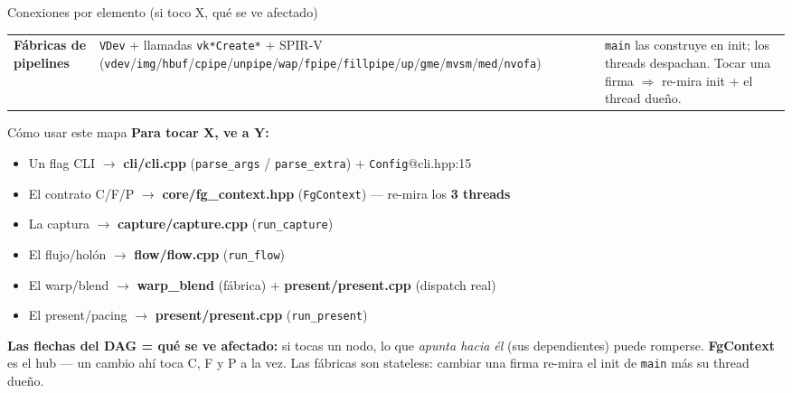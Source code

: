 \documentclass[aspectratio=169]{beamer}
\newcommand{\arr}{\ensuremath{\rightarrow}}
\newcommand{\Lcli}[1]{\textcolor{cliCol}{\textbf{#1}}}
\newcommand{\Lcore}[1]{\textcolor{coreCol}{\textbf{#1}}}
\newcommand{\Lcap}[1]{\textcolor{capCol}{\textbf{#1}}}
\newcommand{\Lflow}[1]{\textcolor{flowCol}{\textbf{#1}}}
\newcommand{\Lwarp}[1]{\textcolor{warpCol}{\textbf{#1}}}
\newcommand{\Lpres}[1]{\textcolor{presCol}{\textbf{#1}}}
\begin{document}
\begin{frame}[allowframebreaks]{Conexiones por elemento (si toco X, qu\'e se ve afectado)}
\begin{longtable}{p{2.2cm} p{5.0cm} p{4.6cm}}
\Lcore{F\'abricas de pipelines} &
\texttt{VDev} + llamadas \texttt{vk*Create*} + SPIR-V (\texttt{vdev}/\texttt{img}/\texttt{hbuf}/\texttt{cpipe}/\texttt{unpipe}/\texttt{wap}/\texttt{fpipe}/\texttt{fillpipe}/\texttt{up}/\texttt{gme}/\texttt{mvsm}/\texttt{med}/\texttt{nvofa}) &
\texttt{main} las construye en init; los threads despachan. Tocar una firma $\Rightarrow$ re-mira init + el thread due\~no. \\

\end{longtable}
\end{frame}

\begin{frame}{C\'omo usar este mapa}
\small
\textbf{Para tocar X, ve a Y:}
\begin{itemize}\setlength\itemsep{2pt}
  \item Un flag CLI \arr{} \Lcli{cli/cli.cpp} (\texttt{parse\_args} / \texttt{parse\_extra}) + \texttt{Config}@cli.hpp:15
  \item El contrato C/F/P \arr{} \Lcore{core/fg\_context.hpp} (\texttt{FgContext}) --- re-mira los \textbf{3 threads}
  \item La captura \arr{} \Lcap{capture/capture.cpp} (\texttt{run\_capture})
  \item El flujo/hol\'on \arr{} \Lflow{flow/flow.cpp} (\texttt{run\_flow})
  \item El warp/blend \arr{} \Lwarp{warp\_blend} (f\'abrica) + \Lpres{present/present.cpp} (dispatch real)
  \item El present/pacing \arr{} \Lpres{present/present.cpp} (\texttt{run\_present})
\end{itemize}
\vspace{4pt}
\textbf{Las flechas del DAG = qu\'e se ve afectado:} si tocas un nodo, lo que \emph{apunta hacia \'el}
(sus dependientes) puede romperse. \Lcore{FgContext} es el hub --- un cambio ah\'i toca C, F y P a la vez.
Las f\'abricas son stateless: cambiar una firma re-mira el init de \texttt{main} m\'as su thread due\~no.
\end{frame}
\end{document}
